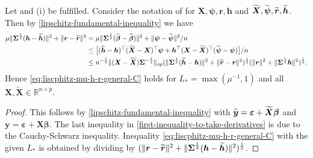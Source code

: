 \documentclass[11pt]{amsart}
\numberwithin{equation}{section}
\numberwithin{equation}{section}
\def\real{{\mathbb{R}}}
\def\R{{\real}}
\def\mathbold{\boldsymbol} %
\def\bh{\mathbold{h}}\def\hhat{\widehat{h}}\def\htil{\widetilde{h}}
\def\br{\mathbold{r}}\def\rhat{\widehat{r}}\def\rtil{\widetilde{r}}\def\rbar{{\overline r}}\def\brbar{{\overline \br}}
\def\bX{\mathbold{X}}\def\hbX{{\widehat{\bX}}}\def\tbX{{\widetilde{\bX}}}\def\bXbar{{\overline \bX}}
\def\by{\mathbold{y}}\def\yhat{\widehat{y}}\def\ytil{\widetilde{y}}\def\ybar{{\overline y}}\def\vby{{\bf y}}
\def\bbeta{\mathbold{\beta}}\def\betahat{\widehat{\beta}}\def\hbeta{\widehat{\beta}}
\def\hbbeta{{{\widehat{\bbeta}}}}
\def\tbbeta{\widetilde{\bbeta}}
\def\ep{\varepsilon}\def\eps{\epsilon}\def\veps{\varepsilon}
\def\bep{ {\mathbold{\ep} }}
\def\bSigma{\mathbold{\Sigma}}\def\hbSigma{{\widehat{\bSigma}}}
\def\bpsi{\mathbold{\psi}}\def\psihat{\widehat{\psi}}\def\hpsi{\widehat{\psi}}
\begin{document}
\begin{proposition}
    \label{prop:lipschtiz}
    Let  and (i) be fulfilled.
    Consider the notation of  for
    $\bX,\bpsi,\br,\bh$ and $\tbX,\tbpsi,\tbr,\tbh$.
    Then by  \eqref{lipschitz-fundamental-inequality} we have
    \begin{align}
        \mu\|\bSigma^{\frac12}(\bh-\tbh)\|^2 + \|\br-\tbr\|^2
        &=\mu\|\bSigma^{\frac12}(\hbbeta-\tbbeta)\|^2 + \|\bpsi-\tbpsi\|^2/n
        \nonumber
        \\&\le
        \big[
        (\tbh - \bh)^\top(\tbX-\bX)^\top\bpsi
        + 
        \bh^\top(\bX-\tbX)^\top(\tbpsi - \bpsi)
        \big]/n
        \label{first-inequality-to-take-derivatives}
        \\&\le
        n^{-\frac12}\|(\bX-\tbX)\bSigma^{-\frac12}\|_{op}
        (\|\bSigma^{\frac12}(\tbh-\bh)\|^2 +  \|\tbr-\br\|^2)^{\frac12}
        (\|\br\|^2 + \|\bSigma^{\frac12}\bh\|^2)^{\frac12}.
        \nonumber
    \end{align}
    Hence \eqref{eq:liscphitz-mu-h-r-general-C} holds for
    $L_* = \max(\mu^{-1},1)$ and
    all $\bX,\tbX\in \R^{n\times p}$.
\end{proposition}
\begin{proof}
    This follows  by \eqref{lipschitz-fundamental-inequality}
    with $\tby = \bep + \tbX\bbeta$ and $\by = \bep + \bX\bbeta$.
    The last inequality in \eqref{first-inequality-to-take-derivatives}
    is due to the Cauchy-Schwarz inequality.
    Inequality \eqref{eq:liscphitz-mu-h-r-general-C} with the given $L_*$
    is obtained by dividing by $(\|\br-\tbr\|^2 + \|\bSigma^{\frac12}(\bh-\tbh)\|^2)^{\frac12}$.
\end{proof}
\end{document}
